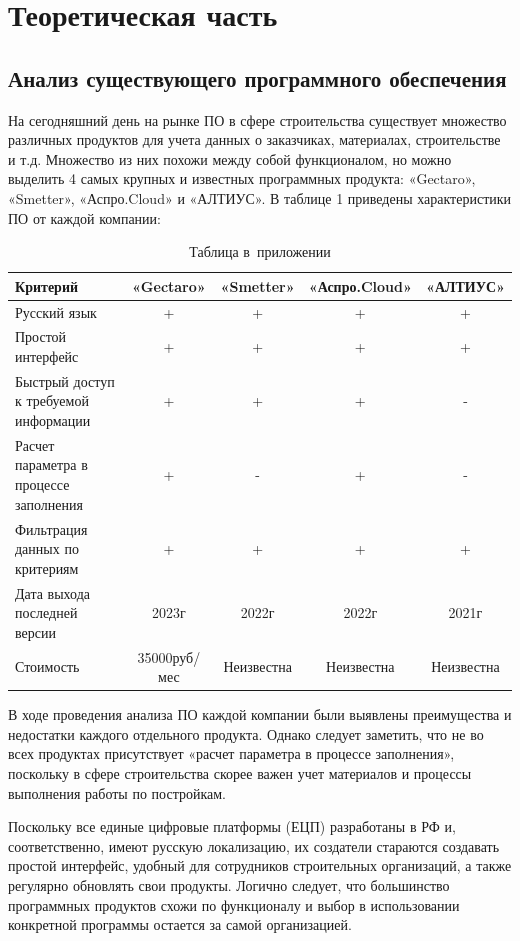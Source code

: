 \documentclass{../SIBGU-state}
\begin{document}
\section{Теоретическая часть}

\subsection{Анализ существующего программного обеспечения}

На сегодняшний день на рынке ПО в сфере строительства существует множество различных продуктов для учета данных о заказчиках, материалах, строительстве и т.д. Множество из них похожи между собой функционалом, но можно выделить 4 самых крупных и известных программных продукта:
«Gectaro», «Smetter», «Аспро.Cloud» и «АЛТИУС». В таблице 1 приведены характеристики ПО от каждой компании:
\begin{table}[htb]
	\caption{Таблица в~приложении}
	\centering
	\small\begin{tabular}{ |p{4.7cm}|c|c|c|c| }
        \hline
		Критерий &«Gectaro» & «Smetter» & «Аспро.Cloud» & «АЛТИУС» \\ \hline
        Русский язык & + & + & + & + \\ \hline
        Простой интерфейс & + & + & + & + \\ \hline
        Быстрый доступ к требуемой информации & + & + & + & - \\ \hline
        Расчет параметра в процессе заполнения & + & - & + & - \\ \hline
        Фильтрация данных по критериям & + & + & + & + \\ \hline
        Дата выхода последней версии & 2023г & 2022г & 2022г & 2021г \\ \hline
        Стоимость & 35000руб/мес & Неизвестна & Неизвестна & Неизвестна \\ \hline
	\end{tabular}
	\label{tab:in_appendix}
\end{table}\par
В ходе проведения анализа ПО каждой компании были выявлены преимущества и недостатки каждого отдельного продукта. Однако следует заметить, что не во всех продуктах присутствует «расчет параметра в процессе заполнения», поскольку в сфере строительства скорее важен учет материалов и процессы выполнения работы по постройкам. \par
Поскольку все единые цифровые платформы (ЕЦП) разработаны в РФ и, соответственно, имеют русскую локализацию, их создатели стараются создавать простой интерфейс, удобный для сотрудников строительных организаций, а также регулярно обновлять свои продукты. Логично следует, что большинство программных продуктов схожи по функционалу и выбор в использовании конкретной программы остается за самой организацией. \par
\end{document}
